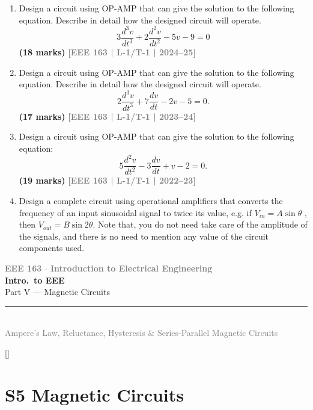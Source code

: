 \documentclass[12pt,a3paper]{article}
\newcommand{\yr}[1]{\hfill\textcolor{gray}{\small\textbf{[#1]}}}
\newcommand{\mk}[1]{\textcolor{orange!70!black}{\small\textbf{(#1 marks)}}}
\newcommand{\secdivider}[3]{%
  \newpage\thispagestyle{empty}%
  \vspace*{\fill}%
  \begin{tcolorbox}[enhanced,colback=#3!6,colframe=#3,boxrule=1.5pt,arc=8pt,
    left=20pt,right=20pt,top=22pt,bottom=22pt,
    shadow={3pt}{-3pt}{0pt}{black!15}]
    \centering
    {\large\textcolor{gray}{\textbf{EEE 163 $\cdot$ Introduction to Electrical Engineering}}}\\[8pt]
    {\fontsize{26}{32}\selectfont\bfseries\textcolor{#3}{Intro.\ to EEE}}\\[6pt]
    {\fontsize{15}{19}\selectfont\textcolor{dgray}{#1}}\\[12pt]
    \textcolor{#3!60}{\rule{0.5\textwidth}{0.5pt}}\\[6pt]
    {\small\textcolor{gray}{#2}}
  \end{tcolorbox}%
  \vspace*{\fill}\newpage%
}
\begin{document}
\begin{enumerate}
  
\item Design a circuit using OP-AMP that can give the solution to the following 
equation. Describe in detail how the designed circuit will operate.
\[
3 \frac{d^3v}{dt^3} + 2 \frac{d^2v}{dt^2} - 5v - 9 = 0
\]
\mk{18} \yr{EEE 163 | L-1/T-1 | 2024--25}
  
\item Design a circuit using OP-AMP that can give the solution to the following equation. Describe in detail how the designed circuit will operate.
\[
2\frac{d^3v}{dt^3} + 7\frac{dv}{dt} - 2v - 5 = 0.
\]
\mk{17} \yr{EEE 163 | L-1/T-1 | 2023--24}


\item Design a circuit using OP-AMP that can give the solution to the following equation:
\[
5\frac{d^2v}{dt^2} - 3\frac{dv}{dt} + v - 2 = 0.
\]
\mk{19} \yr{EEE 163 | L-1/T-1 | 2022--23}

\item Design a complete circuit using operational amplifiers that converts the frequency of
an input sinusoidal signal to twice its value, e.g. if $V_{in}=A\sin \theta$ , then $V_{out}=B\sin 2\theta$.
Note that, you do not need take care of the amplitude of the signals, and there is no need
to mention any value of the circuit components used.

\end{enumerate}


\secdivider{Part V --- Magnetic Circuits}{Ampere's Law, Reluctance, Hysteresis \& Series-Parallel Magnetic Circuits}{cD}

\label{sec:S5}
\titleformat{\section}{\large\bfseries\color{cD}}{}{0em}{}[\titlerule]
\section*{S5 \quad Magnetic Circuits}
\end{document}
